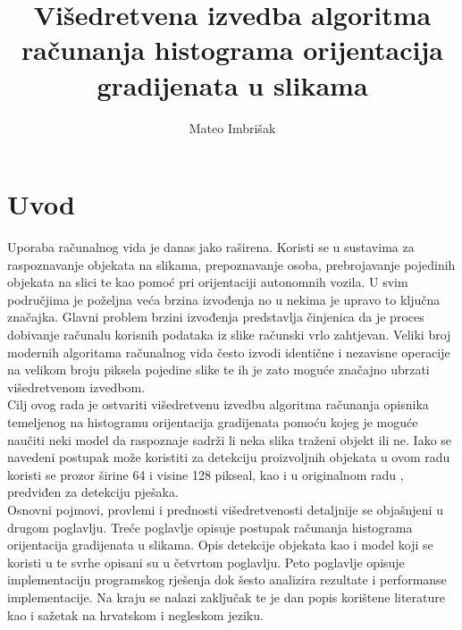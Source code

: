 \documentclass[times, utf8, zavrsni]{fer}
\begin{document}

\title{Višedretvena izvedba algoritma računanja histograma orijentacija gradijenata u slikama}

\author{Mateo Imbrišak}

\maketitle

\zahvala{}

\tableofcontents

\chapter{Uvod}
Uporaba računalnog vida je danas jako raširena. Koristi se u sustavima za raspoznavanje objekata na slikama, prepoznavanje osoba, prebrojavanje pojedinih objekata na slici te kao pomoć pri orijentaciji autonomnih vozila. U svim područjima je poželjna veća brzina izvođenja no u nekima je upravo to ključna značajka. Glavni problem brzini izvođenja predstavlja činjenica da je proces dobivanje računalu korisnih podataka iz slike računski vrlo zahtjevan. Veliki broj modernih algoritama računalnog vida često izvodi identične i nezavisne operacije na velikom broju piksela pojedine slike te ih je zato moguće značajno ubrzati višedretvenom izvedbom. \\

Cilj ovog rada je ostvariti višedretvenu izvedbu algoritma računanja opisnika temeljenog na histogramu orijentacija gradijenata pomoću kojeg je moguće naučiti neki model da raspoznaje sadrži li neka slika traženi objekt ili ne. Iako se navedeni postupak može koristiti za detekciju proizvoljnih objekata u ovom radu koristi se prozor širine 64 i visine 128 pikseal, kao i u originalnom radu \citep{dalal2005histograms}, predviđen za detekciju pješaka. \\

Osnovni pojmovi, provlemi i prednosti višedretvenosti detaljnije se objašnjeni u drugom poglavlju. Treće poglavlje opisuje postupak računanja histograma orijentacija gradijenata u slikama. Opis detekcije objekata kao i model koji se koristi u te svrhe opisani su u četvrtom poglavlju. Peto poglavlje opisuje implementaciju programskog rješenja dok šesto analizira rezultate i performanse implementacije. Na kraju se nalazi zaključak te je dan popis korištene literature kao i sažetak na hrvatskom i negleskom jeziku.
\end{document}

